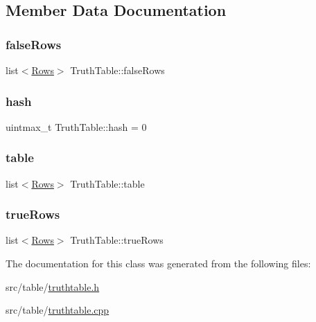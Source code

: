 \subsection{Member Data Documentation}
\mbox{\label{class_truth_table_af585b18e1c5a1d4e456ae25c6d1ab6f9}} 
\subsubsection{\texorpdfstring{false\+Rows}{falseRows}}
{\footnotesize\ttfamily list$<$\hyperlink{class_rows}{Rows}$>$ Truth\+Table\+::false\+Rows\hspace{0.3cm}{\ttfamily [private]}}

\mbox{\label{class_truth_table_a58fc63ab16768b58accfe0448a4cd68c}} 
\subsubsection{\texorpdfstring{hash}{hash}}
{\footnotesize\ttfamily uintmax\+\_\+t Truth\+Table\+::hash = 0\hspace{0.3cm}{\ttfamily [protected]}}

\mbox{\label{class_truth_table_a6b3635efcbbc292d0dc62406fbdbe9e5}} 
\subsubsection{\texorpdfstring{table}{table}}
{\footnotesize\ttfamily list$<$\hyperlink{class_rows}{Rows}$>$ Truth\+Table\+::table\hspace{0.3cm}{\ttfamily [protected]}}

\mbox{\label{class_truth_table_a39ed5bd7c7af143af2bdc1d48eee669f}} 
\subsubsection{\texorpdfstring{true\+Rows}{trueRows}}
{\footnotesize\ttfamily list$<$\hyperlink{class_rows}{Rows}$>$ Truth\+Table\+::true\+Rows\hspace{0.3cm}{\ttfamily [private]}}



The documentation for this class was generated from the following files\+:\begin{DoxyCompactItemize}
\item 
src/table/\hyperlink{truthtable_8h}{truthtable.\+h}\item 
src/table/\hyperlink{truthtable_8cpp}{truthtable.\+cpp}\end{DoxyCompactItemize}
